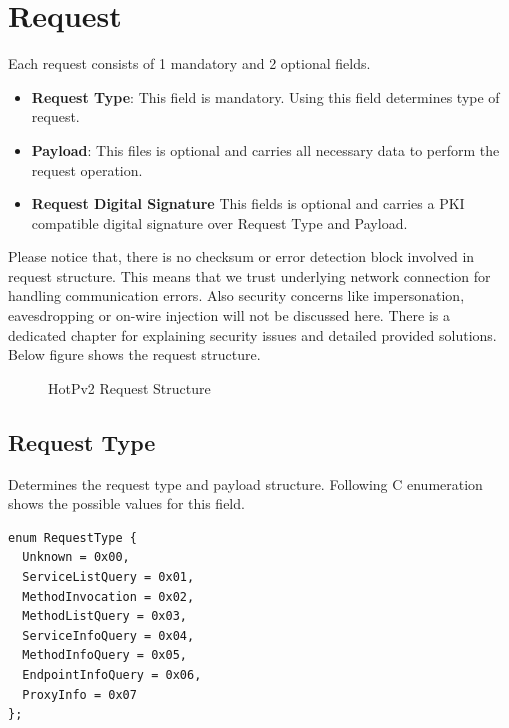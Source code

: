\documentclass[10pt,a4paper]{article}
\begin{document}
\section {Request}
Each request consists of 1 mandatory and 2 optional fields.
\begin{itemize}
  \item \textbf{Request Type}: This field is mandatory. Using this field determines type of request.
  \item \textbf{Payload}: This files is optional and carries all necessary data to perform the request operation.
  \item \textbf{Request Digital Signature} This fields is optional and carries a PKI compatible digital signature over Request Type and Payload.
\end{itemize} 
Please notice that, there is no checksum or error detection block involved in request structure. This means that we trust underlying network connection for handling communication errors. Also security concerns like impersonation, eavesdropping or on-wire injection will not be discussed here. There is a dedicated chapter for explaining security issues and detailed provided solutions. Below figure shows the request structure.

\begin{figure}[!ht]
  \caption{HotPv2 Request Structure}
  \centering
\end{figure}

\subsection {Request Type}
Determines the request type and payload structure. Following C enumeration shows the possible values for this field.

\begin{verbatim}
enum RequestType { 
  Unknown = 0x00, 
  ServiceListQuery = 0x01, 
  MethodInvocation = 0x02,
  MethodListQuery = 0x03,
  ServiceInfoQuery = 0x04,
  MethodInfoQuery = 0x05,
  EndpointInfoQuery = 0x06,
  ProxyInfo = 0x07
};
\end{verbatim}
\end{document}
